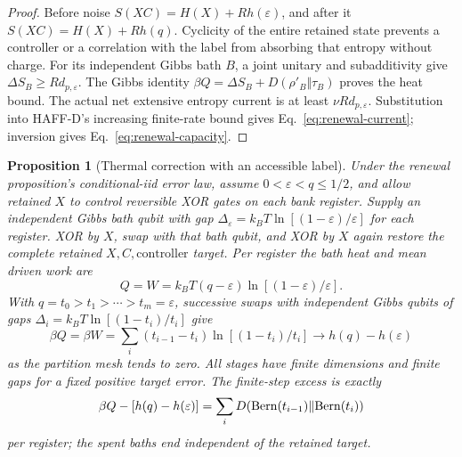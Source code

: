 \documentclass[12pt,a4paper]{article}
\newtheorem{proposition}[theorem]{Proposition}
\begin{document}
\begin{proof}
Before noise $S(XC)=H(X)+Rh(\varepsilon)$, and after it
$S(XC)=H(X)+Rh(q)$. Cyclicity of the entire retained state prevents a
controller or a correlation with the label from absorbing that entropy
without charge. For its independent Gibbs bath $B$, a joint unitary
and subadditivity give $\Delta S_B\ge R d_{p,\varepsilon}$.
The Gibbs identity $\beta Q=\Delta S_B+D(\rho'_B\Vert\tau_B)$ proves
the heat bound. The actual net extensive entropy current is at least
$\nu R d_{p,\varepsilon}$. Substitution into HAFF-D's increasing
finite-rate bound gives Eq.~\eqref{eq:renewal-current}; inversion gives
Eq.~\eqref{eq:renewal-capacity}.
\end{proof}

\begin{proposition}[Thermal correction with an accessible label]
\label{prop:thermal-correction}
Under the renewal proposition's conditional-iid error law, assume
\(0<\varepsilon<q\le1/2\), and allow retained \(X\) to control reversible
XOR gates on each bank register. Supply an independent Gibbs bath qubit
with gap
\(\Delta_\varepsilon=k_BT\ln[(1-\varepsilon)/\varepsilon]\)
for each register. XOR by \(X\), swap with that bath qubit, and XOR by
\(X\) again restore the complete retained \(X,C,\text{controller}\)
target. Per register the bath heat and mean driven work are
\begin{equation}\label{eq:thermal-one}
 Q=W=k_BT(q-\varepsilon)\ln[(1-\varepsilon)/\varepsilon].
\end{equation}
With \(q=t_0>t_1>\cdots>t_m=\varepsilon\), successive swaps with
independent Gibbs qubits of gaps
\(\Delta_i=k_BT\ln[(1-t_i)/t_i]\) give
\begin{equation}\label{eq:thermal-many}
 \beta Q=\beta W=\sum_i(t_{i-1}-t_i)\ln[(1-t_i)/t_i]
 \longrightarrow h(q)-h(\varepsilon)
\end{equation}
as the partition mesh tends to zero. All stages have finite dimensions
and finite gaps for a fixed positive target error.
The finite-step excess is exactly
\[
 \beta Q-[h(q)-h(\varepsilon)]
 =\sum_i D\!\left({\rm Bern}(t_{i-1})\Vert{\rm Bern}(t_i)\right)
\]
per register; the spent baths end independent of the retained target.
\end{proposition}
\end{document}
